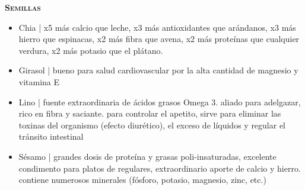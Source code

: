 \bigskip

\textbf{\textsc{Semillas}}

\begin{itemize}
 \item Chia | 
 x5 %
 más calcio que leche, 
 x3 %
 más antioxidantes que arándanos, 
 x3 %
 más hierro que espinacas, 
 x2 %
 más fibra que avena, 
 x2 %
 más proteínas que cualquier verdura, 
 x2 %
 más potasio que el plátano.

 \item Girasol | bueno para salud cardiovascular por la alta cantidad de magnesio y vitamina E

 \item Lino | fuente extraordinaria de ácidos grasos Omega 3. aliado para adelgazar, rico en fibra y saciante. para controlar el apetito, sirve para eliminar las toxinas del organismo (efecto diurético), el exceso de líquidos y regular el tránsito intestinal

 \item Sésamo | grandes dosis de proteína y grasas poli-insaturadas, excelente condimento para platos de regulares, extraordinario aporte de calcio y hierro. contiene numerosos minerales (fósforo, potasio, magnesio, zinc, etc.)

\end{itemize}

\bigskip